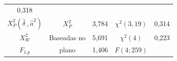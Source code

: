 \documentclass[]{book}
\theoremstyle{definition}
\theoremstyle{definition}
\theoremstyle{definition}
\theoremstyle{remark}
\begin{document}
\begin{longtable}[]{@{}cclcr@{}}
\begin{minipage}[t]{0.07\columnwidth}
0,318\strut
\end{minipage}\tabularnewline
\begin{minipage}[t]{0.40\columnwidth}\centering\strut
\(X_{P}^{2}\left( \hat{\delta}_{.},\hat{a}^{2}\right)\)\strut
\end{minipage} & \begin{minipage}[t]{0.15\columnwidth}\centering\strut
\(X_{P}^{2}\)\strut
\end{minipage} & \begin{minipage}[t]{0.05\columnwidth}\raggedright\strut
3,784\strut
\end{minipage} & \begin{minipage}[t]{0.19\columnwidth}\centering\strut
\(\chi ^{2}(3,19)\)\strut
\end{minipage} & \begin{minipage}[t]{0.07\columnwidth}\raggedleft\strut
0,314\strut
\end{minipage}\tabularnewline
\begin{minipage}[t]{0.40\columnwidth}\centering\strut
\(X_{W}^{2}\)\strut
\end{minipage} & \begin{minipage}[t]{0.15\columnwidth}\centering\strut
Baseadas no\strut
\end{minipage} & \begin{minipage}[t]{0.05\columnwidth}\raggedright\strut
5,691\strut
\end{minipage} & \begin{minipage}[t]{0.19\columnwidth}\centering\strut
\(\chi ^{2}(4)\)\strut
\end{minipage} & \begin{minipage}[t]{0.07\columnwidth}\raggedleft\strut
0,223\strut
\end{minipage}\tabularnewline
\begin{minipage}[t]{0.40\columnwidth}\centering\strut
\(F_{1.p}\)\strut
\end{minipage} & \begin{minipage}[t]{0.15\columnwidth}\centering\strut
plano\strut
\end{minipage} & \begin{minipage}[t]{0.05\columnwidth}\raggedright\strut
1,406\strut
\end{minipage} & \begin{minipage}[t]{0.19\columnwidth}\centering\strut
\(F\left( 4;259\right)\)\strut
\end{minipage} & \begin{minipage}[t]{0.07\columnwidth}\raggedleft\strut

\end{minipage}
\end{longtable}
\end{document}

